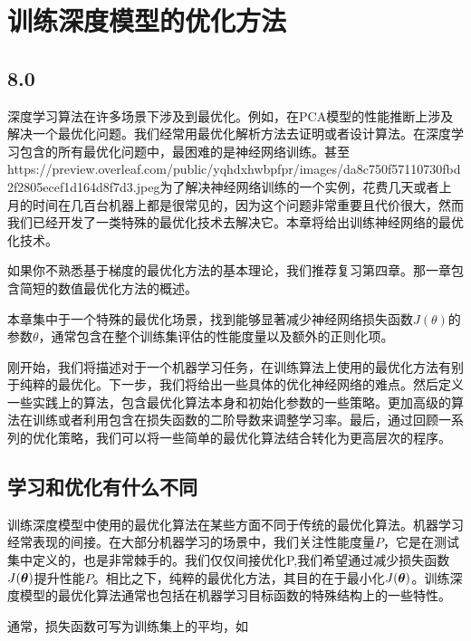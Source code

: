 ﻿\chapter{训练深度模型的优化方法}
\label{chap:8}
\section{8.0}


深度学习算法在许多场景下涉及到最优化。例如，在PCA模型的性能推断上涉及解决一个最优化问题。我们经常用最优化解析方法去证明或者设计算法。在深度学习包含的所有最优化问题中，最困难的是神经网络训练。甚至https://preview.overleaf.com/public/yqhdxhwbpfpr/images/da8c750f57110730fbd2f2805ecef1d164d8f7d3.jpeg为了解决神经网络训练的一个实例，花费几天或者上月的时间在几百台机器上都是很常见的，因为这个问题非常重要且代价很大，然而我们已经开发了一类特殊的最优化技术去解决它。本章将给出训练神经网络的最优化技术。

如果你不熟悉基于梯度的最优化方法的基本理论，我们推荐复习第四章。那一章包含简短的数值最优化方法的概述。

本章集中于一个特殊的最优化场景，找到能够显著减少神经网络损失函数$J(\theta)$的参数$\theta$，通常包含在整个训练集评估的性能度量以及额外的正则化项。

刚开始，我们将描述对于一个机器学习任务，在训练算法上使用的最优化方法有别于纯粹的最优化。下一步，我们将给出一些具体的优化神经网络的难点。然后定义一些实践上的算法，包含最优化算法本身和初始化参数的一些策略。更加高级的算法在训练或者利用包含在损失函数的二阶导数来调整学习率。最后，通过回顾一系列的优化策略，我们可以将一些简单的最优化算法结合转化为更高层次的程序。

\section{学习和优化有什么不同}

训练深度模型中使用的最优化算法在某些方面不同于传统的最优化算法。机器学习经常表现的间接。在大部分机器学习的场景中，我们关注性能度量$P$，它是在测试集中定义的，也是非常棘手的。我们仅仅间接优化P,我们希望通过减少损失函数$J(\boldsymbol{\theta})$提升性能$P$。相比之下，纯粹的最优化方法，其目的在于最小化$J(\boldsymbol{\theta})$。训练深度模型的最优化算法通常也包括在机器学习目标函数的特殊结构上的一些特性。

通常，损失函数可写为训练集上的平均，如

